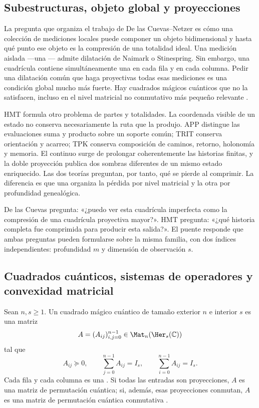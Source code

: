 \subsection{Subestructuras, objeto global y proyecciones}

La pregunta que organiza el trabajo de De las Cuevas--Netzer es cómo una
colección de mediciones locales puede componer un objeto bidimensional y hasta
qué punto ese objeto es la compresión de una totalidad ideal. Una medición
aislada ---una \POVM--- admite dilatación de Naimark o Stinespring. Sin
embargo, una cuadrícula contiene simultáneamente una \POVM en cada fila y en
cada columna. Pedir una dilatación común que haga proyectivas todas esas
mediciones es una condición global mucho más fuerte. Hay cuadrados mágicos
cuánticos que no la satisfacen, incluso en el nivel matricial no conmutativo
más pequeño relevante \citep{delascuevas2020qms}.

HMT formula otro problema de partes y totalidades. La coordenada visible de un
estado no conserva necesariamente la ruta que la produjo. APP distingue las
evaluaciones suma y producto sobre un soporte común; TRIT conserva orientación
y acarreo; TPK conserva composición de caminos, retorno, holonomía y memoria.
El continuo surge de prolongar coherentemente las historias finitas, y la
doble proyección publica dos sombras diferentes de un mismo estado
enriquecido. Las dos teorías preguntan, por tanto, qué se pierde al comprimir.
La diferencia es que una organiza la pérdida por nivel matricial y la otra por
profundidad genealógica.

\begin{intuitionbox}
De las Cuevas pregunta: «¿puedo ver esta cuadrícula imperfecta como la
compresión de una cuadrícula proyectiva mayor?». HMT pregunta: «¿qué historia
completa fue comprimida para producir esta salida?». El puente responde que
ambas preguntas pueden formularse sobre la misma familia, con dos índices
independientes: profundidad $m$ y dimensión de observación $s$.
\end{intuitionbox}

\subsection{Cuadrados cuánticos, sistemas de operadores y convexidad matricial}

Sean $n,s\ge1$. Un cuadrado mágico cuántico de tamaño exterior $n$ e
interior $s$ es una matriz
\[
 A=(A_{ij})_{i,j=0}^{n-1}\in\Mat_n(\Her_s(\mathbb C))
\]
tal que
\[
 A_{ij}\succeq0,\qquad
 \sum_{j=0}^{n-1}A_{ij}=I_s,\qquad
 \sum_{i=0}^{n-1}A_{ij}=I_s.
 \tag{GMC-1.1}
\]
Cada fila y cada columna es una \POVM. Si todas las entradas son proyecciones,
$A$ es una matriz de permutación cuántica; si, además, esas proyecciones
conmutan, $A$ es una matriz de permutación cuántica conmutativa
\citep{delascuevas2020qms,delascuevas2023latin}.

